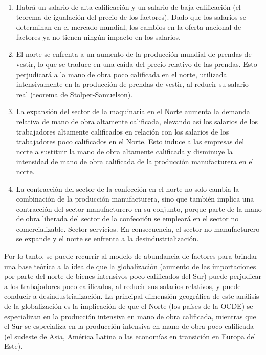 \begin{enumerate}[\bfseries (1)]
    \item Habrá un salario de alta calificación y un salario de baja calificación (el teorema de igualación del precio de los factores). Dado que los salarios se determinan en el mercado mundial, los cambios en la oferta nacional de factores ya no tienen ningún impacto en los salarios.
    \item El norte se enfrenta a un aumento de la producción mundial de prendas de vestir, lo que se traduce en una caída del precio relativo de las prendas. Esto perjudicará a la mano de obra poco calificada en el norte, utilizada intensivamente en la producción de prendas de vestir, al reducir su salario real (teorema de Stolper-Samuelson).
    \item La expansión del sector de la maquinaria en el Norte aumenta la demanda relativa de mano de obra altamente calificada, elevando así los salarios de los trabajadores altamente calificados en relación con los salarios de los trabajadores poco calificados en el Norte. Esto induce a las empresas del norte a sustituir la mano de obra altamente calificada y disminuye la intensidad de mano de obra calificada de la producción manufacturera en el norte.
    \item La contracción del sector de la confección en el norte no solo cambia la combinación de la producción manufacturera, sino que también implica una contracción del sector manufacturero en su conjunto, porque parte de la mano de obra liberada del sector de la confección se empleará en el sector no comercializable. Sector servicios. En consecuencia, el sector no manufacturero se expande y el norte se enfrenta a la desindustrialización.
\end{enumerate}
Por lo tanto, se puede recurrir al modelo de abundancia de factores para brindar una base teórica a la idea de que la globalización (aumento de las importaciones por parte del norte de bienes intensivos poco calificados del Sur) puede perjudicar a los trabajadores poco calificados, al reducir sus salarios relativos, y puede conducir a desindustrialización. La principal dimensión geográfica de este análisis de la globalización es la implicación de que el Norte (los países de la OCDE) se especializan en la producción intensiva en mano de obra calificada, mientras que el Sur se especializa en la producción intensiva en mano de obra poco calificada (el sudeste de Asia, América Latina o las economías en transición en Europa del Este).\\
